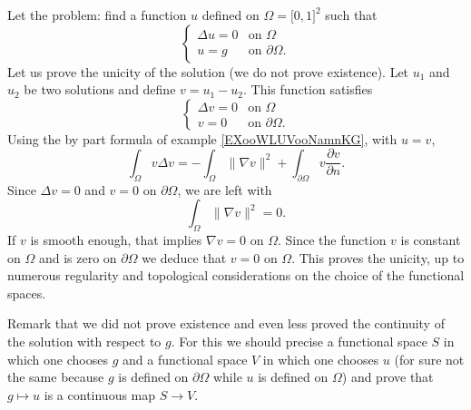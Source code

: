 \begin{example}          \label{EXooLTODooOwJtGC}
    Let the problem: find a function \( u\) defined on \( \Omega=\mathopen[ 0 , 1 \mathclose]^2\) such that
    \begin{equation}
         \begin{cases}
             \Delta u=0    &   \text{on } \Omega\\
             u=g    &    \text{on } \partial\Omega.
         \end{cases}
     \end{equation}
     Let us prove the unicity of the solution (we do not prove existence). Let \( u_1\) and \( u_2\) be two solutions and define \( v=u_1-u_2\). This function satisfies
     \begin{equation}
          \begin{cases}
              \Delta v=0    &   \text{on } \Omega\\
              v=0    &    \text{on }\partial\Omega.  
          \end{cases}
      \end{equation}
      Using the by part formula of example \ref{EXooWLUVooNamnKG}, with \( u=v\),
      \begin{equation}
          \int_{\Omega}v\Delta v=-\int_{\Omega}\| \nabla v \|^2+\int_{\partial\Omega}v\frac{ \partial v }{ \partial n }.
      \end{equation}
      Since \( \Delta v=0\) and \( v=0\) on \( \partial\Omega\), we are left with
      \begin{equation}
          \int_{\Omega}\| \nabla v \|^2=0.
      \end{equation}
      If \( v\) is smooth enough, that implies \( \nabla v=0\) on \( \Omega\). Since the function \( v\) is constant on \( \Omega\) and is zero on \( \partial\Omega\) we deduce that \( v=0\) on \( \Omega\). This proves the unicity, up to numerous regularity and topological considerations on the choice of the functional spaces.

     Remark that we did not prove existence and even less proved the continuity of the solution with respect to \( g\). For this we should precise a functional space \( S\) in which one chooses \( g\) and a functional space \( V\) in which one chooses \( u\) (for sure not the same because \( g\) is defined on \( \partial \Omega\) while \( u\) is defined on \( \Omega\)) and prove that \( g\mapsto u\) is a continuous map \( S\to V\).
\end{example}

